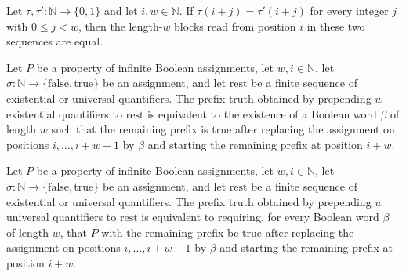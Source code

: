 \begin{theorem}
\label{Complexity.TQBFHard.readBlock_congr}
\leanok
{}
Let $\tau,\tau':\mathbb N\to\{0,1\}$ and let $i,w\in\mathbb N$. If
$\tau(i+j)=\tau'(i+j)$ for every integer $j$ with $0\le j<w$, then the length-$w$ blocks
read from position $i$ in these two sequences are equal.
\end{theorem}

\begin{theorem}
\label{Complexity.TQBFHard.prefixTruth_replicate_ex}
\leanok
{}
Let $P$ be a property of infinite Boolean assignments, let $w,i\in\mathbb{N}$, let
$\sigma:\mathbb{N}\to\{\mathrm{false},\mathrm{true}\}$ be an assignment, and let
$\mathrm{rest}$ be a finite sequence of existential or universal quantifiers. The prefix
truth obtained by prepending $w$ existential quantifiers to $\mathrm{rest}$ is
equivalent to the existence of a Boolean word $\beta$ of length $w$ such that the
remaining prefix is true after replacing the assignment on positions $i,\ldots,i+w-1$ by
$\beta$ and starting the remaining prefix at position $i+w$.
\end{theorem}

\begin{theorem}
\label{Complexity.TQBFHard.prefixTruth_replicate_all}
\leanok
{}
Let $P$ be a property of infinite Boolean assignments, let $w,i\in\mathbb{N}$, let
$\sigma:\mathbb{N}\to\{\mathrm{false},\mathrm{true}\}$ be an assignment, and let
$\mathrm{rest}$ be a finite sequence of existential or universal quantifiers. The prefix
truth obtained by prepending $w$ universal quantifiers to $\mathrm{rest}$ is equivalent
to requiring, for every Boolean word $\beta$ of length $w$, that $P$ with the remaining
prefix be true after replacing the assignment on positions $i,\ldots,i+w-1$ by $\beta$
and starting the remaining prefix at position $i+w$.
\end{theorem}

